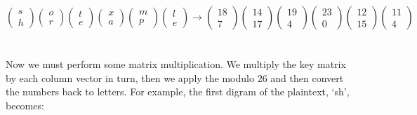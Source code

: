 \documentclass[Lau,binding=0.6cm,oneside]{sapthesis}
\begin{document}
\begin{equation}
\begin{pmatrix}s\\h\end{pmatrix}
\begin{pmatrix}o\\r\end{pmatrix}
\begin{pmatrix}t\\e\end{pmatrix}
\begin{pmatrix}x\\a\end{pmatrix}
\begin{pmatrix}m\\p\end{pmatrix}
\begin{pmatrix}l\\e\end{pmatrix}
\rightarrow
\begin{pmatrix}18\\7\end{pmatrix}
\begin{pmatrix}14\\17\end{pmatrix}
\begin{pmatrix}19\\4\end{pmatrix}
\begin{pmatrix}23\\0\end{pmatrix}
\begin{pmatrix}12\\15\end{pmatrix}
\begin{pmatrix}11\\4\end{pmatrix}
\end{equation}
\ \\\\
Now we must perform some matrix multiplication. We multiply the key matrix by each column vector in turn, then we apply the modulo 26 and then convert the numbers back to letters. For example, the first digram of the plaintext, `sh', becomes:\\\\
\end{document}
